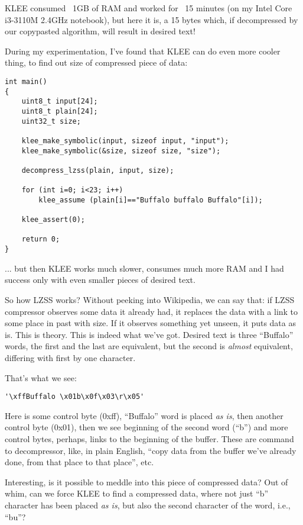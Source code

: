 KLEE consumed ~1GB of RAM and worked for ~15 minutes (on my Intel Core i3-3110M 2.4GHz notebook), 
but here it is, a 15 bytes which, if decompressed by our copypasted algorithm, will result in desired text!

During my experimentation, I've found that KLEE can do even more cooler thing, to find out size of compressed piece of data:

\begin{lstlisting}
int main()
{
	uint8_t input[24];
	uint8_t plain[24];
	uint32_t size;
  
	klee_make_symbolic(input, sizeof input, "input");
	klee_make_symbolic(&size, sizeof size, "size");
	
	decompress_lzss(plain, input, size);

	for (int i=0; i<23; i++)
		klee_assume (plain[i]=="Buffalo buffalo Buffalo"[i]);

	klee_assert(0);
	
	return 0;
}
\end{lstlisting}

... but then KLEE works much slower, consumes much more RAM and I had success only with even smaller pieces of desired text.

So how LZSS works? Without peeking into Wikipedia, we can say that: 
if LZSS compressor observes some data it already had, it replaces the data with a link to some place in past with size. 
If it observes something yet unseen, it puts data as is.
This is theory.
This is indeed what we've got. Desired text is three ``Buffalo'' words, the first and the last are equivalent, but the second is \textit{almost} equivalent, 
differing with first by one character.

That's what we see:

\begin{lstlisting}
'\xffBuffalo \x01b\x0f\x03\r\x05'
\end{lstlisting}

Here is some control byte (0xff), ``Buffalo'' word is placed \textit{as is}, then another control byte (0x01), 
then we see beginning of the second word (``b'') and more
control bytes, perhaps, links to the beginning of the buffer.
These are command to decompressor, like, in plain English, ``copy data from the buffer we've already done, from that place to that place'', etc.

Interesting, is it possible to meddle into this piece of compressed data?
Out of whim, can we force KLEE to find a compressed data, where not just ``b'' character has been placed \textit{as is},
but also the second character of the word, i.e., ``bu''?

